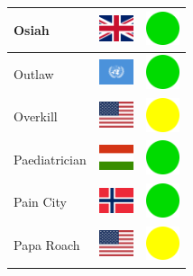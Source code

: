 \documentclass[12pt, a4paper, twoside]{report}
\begin{document}
\begin{center}
\begin{longtable}{|p{5cm}|p{2cm}|p{2cm}|}
 Osiah                                                      & \includegraphics[width=1cm]{../img/flags/gb} &   \includegraphics[width=1cm]{../likes/y} \\ \hline
 Outlaw                                                     & \includegraphics[width=1cm]{../img/flags/un} &   \includegraphics[width=1cm]{../likes/y} \\ \hline
 Overkill                                                   & \includegraphics[width=1cm]{../img/flags/us} &   \includegraphics[width=1cm]{../likes/m} \\ \hline
 Paediatrician                                              & \includegraphics[width=1cm]{../img/flags/hu} &   \includegraphics[width=1cm]{../likes/y} \\ \hline
 Pain City                                                  & \includegraphics[width=1cm]{../img/flags/no} &   \includegraphics[width=1cm]{../likes/y} \\ \hline
 Papa Roach                                                 & \includegraphics[width=1cm]{../img/flags/us} &   \includegraphics[width=1cm]{../likes/m} \\ \hline

\end{longtable}
\end{center}
\end{document}
